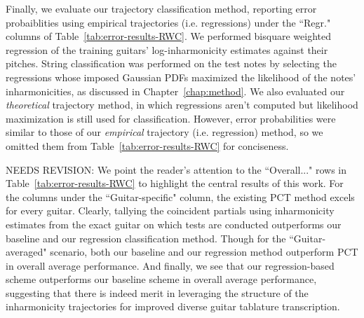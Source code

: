 \documentclass[12pt]{cmuthesis}
\begin{document}
Finally, we evaluate our trajectory classification method, reporting error probaiblities using empirical trajectories (i.e. regressions) under the ``Regr." columns of Table~\ref{tab:error-results-RWC}. We performed bisquare weighted regression of the training guitars' log-inharmonicity estimates against their pitches. String classification was performed on the test notes by selecting the regressions whose imposed Gaussian PDFs maximized the likelihood of the notes' inharmonicities, as discussed in Chapter~\ref{chap:method}. We also evaluated our \textit{theoretical} trajectory method, in which regressions aren't computed but likelihood maximization is still used for classification. However, error probabilities were similar to those of our \textit{empirical} trajectory (i.e. regression) method, so we omitted them from Table~\ref{tab:error-results-RWC} for conciseness.


NEEDS REVISION: We point the reader's attention to the ``Overall..." rows in Table~\ref{tab:error-results-RWC} to highlight the central results of this work. For the columns under the ``Guitar-specific" column, the existing PCT method excels for every guitar. Clearly, tallying the coincident partials using inharmonicity estimates from the exact guitar on which tests are conducted outperforms our baseline and our regression classification method. Though for the ``Guitar-averaged" scenario, both our baseline and our regression method outperform PCT in overall average performance. And finally, we see that our regression-based scheme outperforms our baseline scheme in overall average performance, suggesting that there is indeed merit in leveraging the structure of the inharmonicity trajectories for improved diverse guitar tablature transcription.
\end{document}
